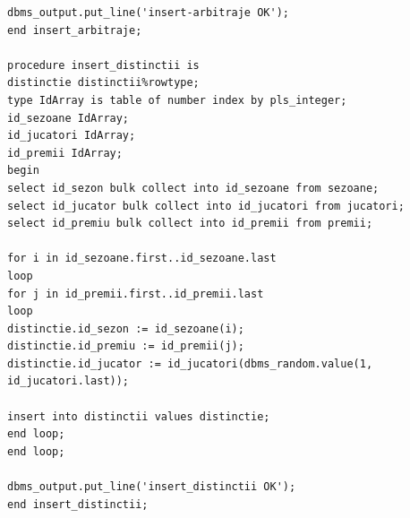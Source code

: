 \documentclass{article}
\begin{document}
\begin{multicols}{2}
\begin{lstlisting}
dbms_output.put_line('insert-arbitraje OK');
end insert_arbitraje;

procedure insert_distinctii is
distinctie distinctii%rowtype;
type IdArray is table of number index by pls_integer;
id_sezoane IdArray;
id_jucatori IdArray;
id_premii IdArray;
begin
select id_sezon bulk collect into id_sezoane from sezoane;
select id_jucator bulk collect into id_jucatori from jucatori;
select id_premiu bulk collect into id_premii from premii;

for i in id_sezoane.first..id_sezoane.last
loop
for j in id_premii.first..id_premii.last
loop
distinctie.id_sezon := id_sezoane(i);
distinctie.id_premiu := id_premii(j);
distinctie.id_jucator := id_jucatori(dbms_random.value(1, id_jucatori.last));

insert into distinctii values distinctie;
end loop;
end loop;

dbms_output.put_line('insert_distinctii OK');
end insert_distinctii;


\end{lstlisting}
\end{multicols}
\end{document}
